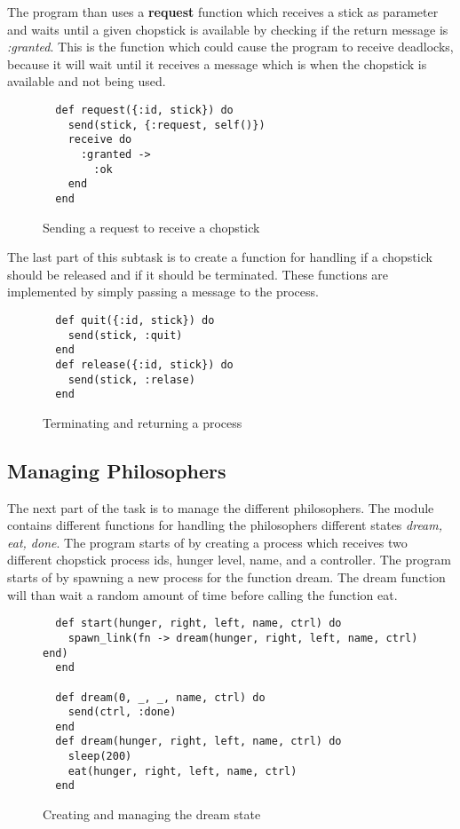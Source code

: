 \documentclass[a4paper,11pt]{article}
\begin{document}
The program than uses a \textbf{request} function which receives a stick as parameter and waits until a given chopstick is available by checking if the return message is \textit{:granted}. This is the function which could cause the program to receive deadlocks, because it will wait until it receives a message which is when the chopstick is available and not being used.

\begin{figure}[H]
\begin{verbatim}
  def request({:id, stick}) do
    send(stick, {:request, self()})
    receive do
      :granted ->
        :ok
    end
  end
\end{verbatim}
\caption{Sending a request to receive a chopstick}
\label{Figure:2}
\end{figure}

The last part of this subtask is to create a function for handling if a chopstick should be released and if it should be terminated. These functions are implemented by simply passing a message to the process.

\begin{figure}[H]
\begin{verbatim}
  def quit({:id, stick}) do
    send(stick, :quit)
  end
  def release({:id, stick}) do
    send(stick, :relase)
  end
\end{verbatim}
\caption{Terminating and returning a process}
\label{Figure:3}
\end{figure}

\subsection*{Managing Philosophers}
The next part of the task is to manage the different philosophers. The module contains different functions for handling the philosophers different states \textit{dream, eat, done}. The program starts of by creating a process which receives two different chopstick process ids, hunger level, name, and a controller. The program starts of by spawning a new process for the function dream. The dream function will than wait a random amount of time before calling the function eat.

\begin{figure}[H]
\begin{verbatim}
  def start(hunger, right, left, name, ctrl) do
    spawn_link(fn -> dream(hunger, right, left, name, ctrl) end)
  end

  def dream(0, _, _, name, ctrl) do
    send(ctrl, :done)
  end
  def dream(hunger, right, left, name, ctrl) do
    sleep(200)
    eat(hunger, right, left, name, ctrl)
  end
\end{verbatim}
\caption{Creating and managing the dream state}
\label{Figure:4}
\end{figure}
\end{document}
